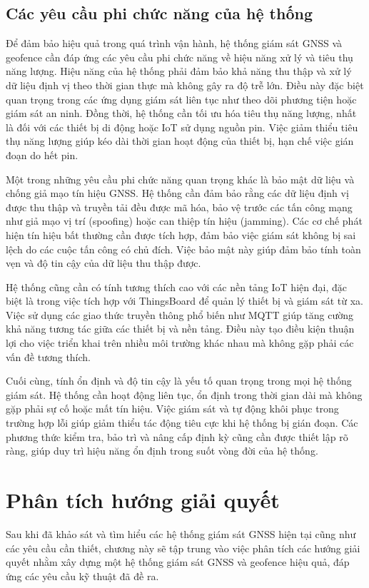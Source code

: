 \documentclass[../DoAn.tex]{subfiles}
\begin{document}
\subsection{Các yêu cầu phi chức năng của hệ thống}
\label{subsection:2.1.3}
Để đảm bảo hiệu quả trong quá trình vận hành, hệ thống giám sát GNSS và geofence cần đáp ứng các yêu cầu phi chức năng về hiệu năng xử lý và tiêu thụ năng lượng. Hiệu năng của hệ thống phải đảm bảo khả năng thu thập và xử lý dữ liệu định vị theo thời gian thực mà không gây ra độ trễ lớn. Điều này đặc biệt quan trọng trong các ứng dụng giám sát liên tục như theo dõi phương tiện hoặc giám sát an ninh. Đồng thời, hệ thống cần tối ưu hóa tiêu thụ năng lượng, nhất là đối với các thiết bị di động hoặc IoT sử dụng nguồn pin. Việc giảm thiểu tiêu thụ năng lượng giúp kéo dài thời gian hoạt động của thiết bị, hạn chế việc gián đoạn do hết pin.

Một trong những yêu cầu phi chức năng quan trọng khác là bảo mật dữ liệu và chống giả mạo tín hiệu GNSS. Hệ thống cần đảm bảo rằng các dữ liệu định vị được thu thập và truyền tải đều được mã hóa, bảo vệ trước các tấn công mạng như giả mạo vị trí (spoofing) hoặc can thiệp tín hiệu (jamming). Các cơ chế phát hiện tín hiệu bất thường cần được tích hợp, đảm bảo việc giám sát không bị sai lệch do các cuộc tấn công có chủ đích. Việc bảo mật này giúp đảm bảo tính toàn vẹn và độ tin cậy của dữ liệu thu thập được.

Hệ thống cũng cần có tính tương thích cao với các nền tảng IoT hiện đại, đặc biệt là trong việc tích hợp với ThingsBoard để quản lý thiết bị và giám sát từ xa. Việc sử dụng các giao thức truyền thông phổ biến như MQTT giúp tăng cường khả năng tương tác giữa các thiết bị và nền tảng. Điều này tạo điều kiện thuận lợi cho việc triển khai trên nhiều môi trường khác nhau mà không gặp phải các vấn đề tương thích.

Cuối cùng, tính ổn định và độ tin cậy là yếu tố quan trọng trong mọi hệ thống giám sát. Hệ thống cần hoạt động liên tục, ổn định trong thời gian dài mà không gặp phải sự cố hoặc mất tín hiệu. Việc giám sát và tự động khôi phục trong trường hợp lỗi giúp giảm thiểu tác động tiêu cực khi hệ thống bị gián đoạn. Các phương thức kiểm tra, bảo trì và nâng cấp định kỳ cũng cần được thiết lập rõ ràng, giúp duy trì hiệu năng ổn định trong suốt vòng đời của hệ thống.
\section{Phân tích hướng giải quyết}
\label{section:2.2}
Sau khi đã khảo sát và tìm hiểu các hệ thống giám sát GNSS hiện tại cũng như các yêu cầu cần thiết, chương này sẽ tập trung vào việc phân tích các hướng giải quyết nhằm xây dựng một hệ thống giám sát GNSS và geofence hiệu quả, đáp ứng các yêu cầu kỹ thuật đã đề ra.
\end{document}
